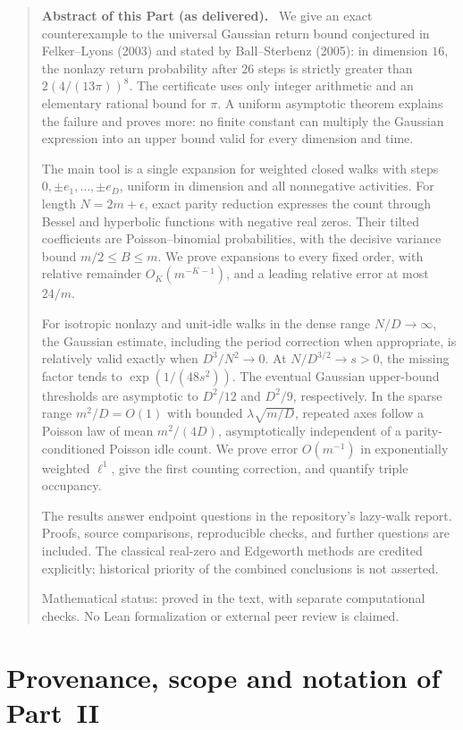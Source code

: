 \documentclass[11pt,letterpaper]{article}
\theoremstyle{remark}\newtheorem{remark}[theorem]{Remark}
\newenvironment{partabstract}{\begin{quote}\small\noindent\textbf{Abstract of this Part (as delivered).}\ }{\end{quote}}
\begin{document}
\begin{partabstract}
We give an exact counterexample to the universal Gaussian return bound
conjectured in Felker--Lyons (2003) and stated by Ball--Sterbenz (2005):
in dimension $16$, the nonlazy return probability after $26$ steps is
strictly greater than $2(4/(13\pi))^8$. The certificate uses only integer
arithmetic and an elementary rational bound for $\pi$.
A uniform asymptotic theorem explains the failure and proves more:
no finite constant can multiply the Gaussian expression into an upper
bound valid for every dimension and time.

The main tool is a single expansion for weighted closed walks with steps
$0,\pm e_1,\ldots,\pm e_D$, uniform in dimension and all nonnegative
activities. For length $N=2m+\epsilon$, exact parity reduction expresses
the count through Bessel and hyperbolic functions with negative real
zeros. Their tilted coefficients are Poisson--binomial probabilities,
with the decisive variance bound $m/2\le B\le m$. We prove expansions
to every fixed order, with relative remainder $O_K(m^{-K-1})$, and a
leading relative error at most $24/m$.

For isotropic nonlazy and unit-idle walks in the dense range
$N/D\to\infty$, the Gaussian estimate, including the period correction
when appropriate, is relatively valid exactly when
$D^3/N^2\to0$. At $N/D^{3/2}\to s>0$, the missing factor tends to
$\exp(1/(48s^2))$. The eventual Gaussian upper-bound thresholds
are asymptotic to $D^2/12$ and $D^2/9$, respectively. In the sparse range $m^2/D=O(1)$ with bounded
$\lambda\sqrt{m/D}$, repeated axes
follow a Poisson law of mean $m^2/(4D)$, asymptotically independent of
a parity-conditioned Poisson idle count. We prove error $O(m^{-1})$
in exponentially weighted $\ell^1$, give the first counting correction,
and quantify triple occupancy.

The results answer endpoint questions in the repository's lazy-walk
report. Proofs, source comparisons, reproducible checks, and further questions
are included. The classical
real-zero and Edgeworth methods are credited explicitly; historical
priority of the combined conclusions is not asserted.

\smallskip\noindent
Mathematical status: proved in the text, with separate computational checks.
No Lean formalization or external peer review is claimed.
\end{partabstract}

\section{Provenance, scope and notation of Part~II}\label{lcw:ulb:sec:front}
\end{document}
